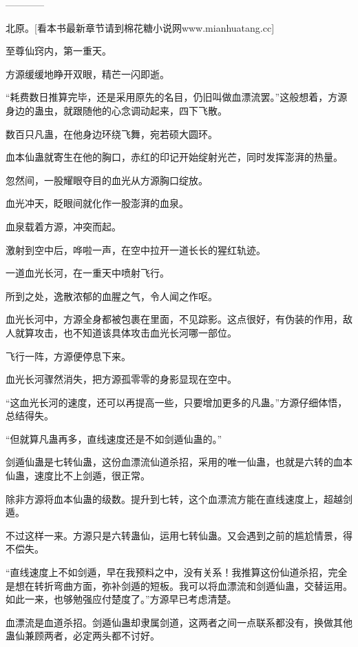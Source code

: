 
\begin{this_body}

------------

北原。[看本书最新章节请到棉花糖小说网www.mianhuatang.cc]

至尊仙窍内，第一重天。

方源缓缓地睁开双眼，精芒一闪即逝。

“耗费数日推算完毕，还是采用原先的名目，仍旧叫做血漂流罢。”这般想着，方源身边的蛊虫，就跟随他的心念调动起来，四下飞散。

数百只凡蛊，在他身边环绕飞舞，宛若硕大圆环。

血本仙蛊就寄生在他的胸口，赤红的印记开始绽射光芒，同时发挥澎湃的热量。

忽然间，一股耀眼夺目的血光从方源胸口绽放。

血光冲天，眨眼间就化作一股澎湃的血泉。

血泉载着方源，冲突而起。

激射到空中后，哗啦一声，在空中拉开一道长长的猩红轨迹。

一道血光长河，在一重天中喷射飞行。

所到之处，逸散浓郁的血腥之气，令人闻之作呕。

血光长河中，方源全身都被包裹在里面，不见踪影。这点很好，有伪装的作用，敌人就算攻击，也不知道该具体攻击血光长河哪一部位。

飞行一阵，方源便停息下来。

血光长河骤然消失，把方源孤零零的身影显现在空中。

“这血光长河的速度，还可以再提高一些，只要增加更多的凡蛊。”方源仔细体悟，总结得失。

“但就算凡蛊再多，直线速度还是不如剑遁仙蛊的。”

剑遁仙蛊是七转仙蛊，这份血漂流仙道杀招，采用的唯一仙蛊，也就是六转的血本仙蛊，速度比不上剑遁，很正常。

除非方源将血本仙蛊的级数。提升到七转，这个血漂流方能在直线速度上，超越剑遁。

不过这样一来。方源只是六转蛊仙，运用七转仙蛊。又会遇到之前的尴尬情景，得不偿失。

“直线速度上不如剑遁，早在我预料之中，没有关系！我推算这份仙道杀招，完全是想在转折弯曲方面，弥补剑遁的短板。我可以将血漂流和剑遁仙蛊，交替运用。如此一来，也够勉强应付楚度了。”方源早已考虑清楚。

血漂流是血道杀招。剑遁仙蛊却隶属剑道，这两者之间一点联系都没有，换做其他蛊仙兼顾两者，必定两头都不讨好。


\end{this_body}

